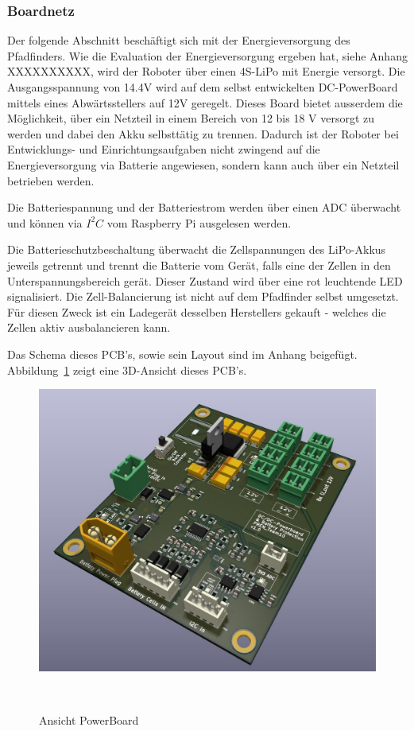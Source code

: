 \documentclass[main.tex]{subfiles} %
\begin{document}

\subsubsection{Boardnetz}

Der folgende Abschnitt beschäftigt sich mit der Energieversorgung des
Pfadfinders. Wie die Evaluation der Energieversorgung ergeben hat, siehe Anhang
XXXXXXXXXX, wird der Roboter über einen 4S-LiPo mit Energie versorgt. Die
Ausgangsspannung von 14.4V wird auf dem selbst entwickelten DC-PowerBoard
mittels eines Abwärtsstellers auf 12V geregelt. Dieses Board bietet ausserdem
die Möglichkeit, über ein Netzteil in einem Bereich von 12 bis 18 V versorgt zu
werden und dabei den Akku selbsttätig zu trennen. Dadurch ist der Roboter bei
Entwicklungs- und Einrichtungsaufgaben nicht zwingend auf die Energieversorgung
via Batterie angewiesen, sondern kann auch über ein Netzteil betrieben werden.

Die Batteriespannung und der Batteriestrom werden über einen ADC überwacht und
können via $I^2C$ vom Raspberry Pi ausgelesen werden.

Die Batterieschutzbeschaltung überwacht die Zellspannungen des LiPo-Akkus
jeweils getrennt und trennt die Batterie vom Gerät, falls eine der Zellen in
den Unterspannungsbereich gerät. Dieser Zustand wird über eine rot leuchtende
LED signalisiert. Die Zell-Balancierung ist nicht auf dem Pfadfinder selbst
umgesetzt. Für diesen Zweck ist ein Ladegerät desselben Herstellers gekauft -
welches die Zellen aktiv ausbalancieren kann.

Das Schema dieses PCB's, sowie sein Layout sind im Anhang beigefügt.
Abbildung~\ref{PowerBoard_Ansicht} zeigt eine 3D-Ansicht dieses PCB's.

\begin{figure}[H]
    \centering
    \includegraphics[width = 0.75\linewidth]{fig_Boardnetz/PowerDistributionBoard.jpg}
    \caption{Ansicht PowerBoard}~\label{PowerBoard_Ansicht}
\end{figure}
\end{document}
